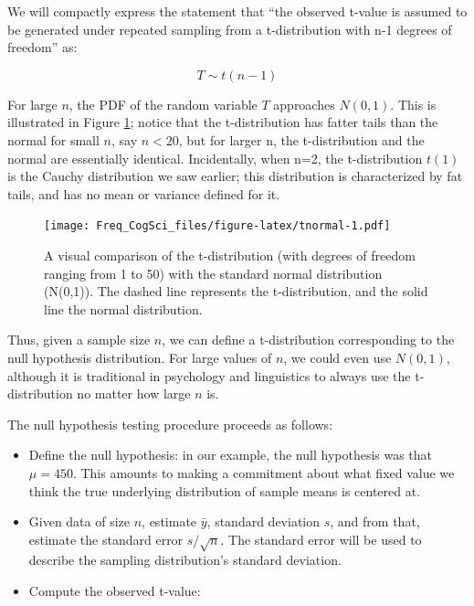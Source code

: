 \documentclass[12pt,]{krantz}
\providecommand{\tightlist}{%
  \setlength{\itemsep}{0pt}\setlength{\parskip}{0pt}}
\begin{document}
We will compactly express the statement that ``the observed t-value is assumed to be generated under repeated sampling from a t-distribution with n-1 degrees of freedom'' as:

\begin{equation}
T \sim t(n-1)
\end{equation}

For large \(n\), the PDF of the random variable \(T\) approaches \(N(0,1)\). This is illustrated in Figure \ref{fig:tnormal}; notice that the t-distribution has fatter tails than the normal for small \(n\), say \(n<20\), but for larger n, the t-distribution and the normal are essentially identical. Incidentally, when n=2, the t-distribution \(t(1)\) is the Cauchy distribution we saw earlier; this distribution is characterized by fat tails, and has no mean or variance defined for it.

\begin{figure}
\centering
\texttt{[image: Freq\_CogSci\_files/figure-latex/tnormal-1.pdf]}
\caption{\label{fig:tnormal}A visual comparison of the t-distribution (with degrees of freedom ranging from 1 to 50) with the standard normal distribution (N(0,1)). The dashed line represents the t-distribution, and the solid line the normal distribution.}
\end{figure}

Thus, given a sample size \(n\), we can define a t-distribution corresponding to the null hypothesis distribution. For large values of \(n\), we could even use \(N(0,1)\), although it is traditional in psychology and linguistics to always use the t-distribution no matter how large \(n\) is.

The null hypothesis testing procedure proceeds as follows:

\begin{itemize}
\tightlist
\item
  Define the null hypothesis: in our example, the null hypothesis was that \(\mu = 450\). This amounts to making a commitment about what fixed value we think the true underlying distribution of sample means is centered at.
\item
  Given data of size \(n\), estimate \(\bar{y}\), standard deviation \(s\), and from that, estimate the standard error \(s/\sqrt{n}\). The standard error will be used to describe the sampling distribution's standard deviation.
\item
  Compute the observed t-value:
\end{itemize}
\end{document}
